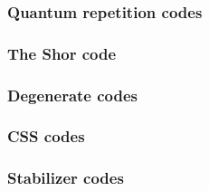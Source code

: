 \documentclass{article}
\begin{document}
\subsubsection{Quantum repetition codes}

\subsubsection{The Shor code}

\subsubsection{Degenerate codes}

\subsubsection{CSS codes}

\subsubsection{Stabilizer codes}
\end{document}

